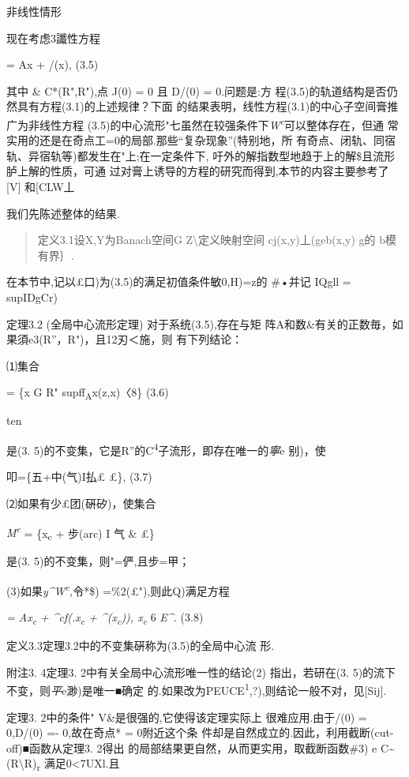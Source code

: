 \documentclass{article}
\begin{document}
非线性情形

现在考虑3讖性方程

= Ax + /(x), (3.5)

其中 \& C*(R",R"),点 J(0) = 0 且 D/(0) = 0.问题是:方
程(3.5)的轨道结构是否仍然具有方程(3.1)的上述规律？下面
的结果表明，线性方程(3.1)的中心子空间膏推广为非线性方程
(3.5)的中心流形"七虽然在较强条件下\emph{W\textsuperscript{c}}可以整体存在，但通
常实用的还是在奇点工=0的局部.那些``复杂现象''(特别地，所
有奇点、闭轨、同宿轨、异宿轨等)都发生在"上;在一定条件下,
吁外的解指数型地趋于上的解\$且流形胪上解的性质，可通
过对膏上诱导的方程的研究而得到,本节的内容主要参考了 {[}V{]} 和{[}CLW丄

我们先陈述整体的结果.

\begin{quote}
定义3.1设X,Y为Banach空间G Z\textbackslash{}定义映射空间
cj(x,y)丄(geb(x,y)\textbar{} g的 b模有界｝.
\end{quote}

在本节中,记以£口)为(3.5)的满足初值条件敏0,H)=z的 \#•并记 IQgll =
supIDgCr)

定理3.2 (全局中心流形定理) 对于系统(3.5),存在与矩
阵A和数\&有关的正数毎，如果須e3(R''，R")，且12刃\textbar{}＜施，则
有下列结论：

⑴集合

= \{x G R" \textbar{}
sup\textbar{}ff\textsubscript{A}x(z,x)\textbar{}〈8\} (3.6)

ten

是(3.
5)的不变集，它是R''的C\textsuperscript{4}子流形，即存在唯一的\emph{寧}e
别)，使

叩=\{五+中(气)I払£ £\}, (3.7)

⑵如果有少£团(硏矽)，使集合

\emph{M\textsuperscript{c}} = \{x\textsubscript{c} + 步(arc) I 气 \& £\}

是(3. 5)的不变集，则"=俨,且步=甲；

(3)如果\emph{y\^{}W\textsuperscript{c},}令*\$) =\%2(£"),则此Q)满足方程

\emph{= Ax\textsubscript{c} + \^{}cf(.x\textsubscript{c} +
\^{}(x\textsubscript{c})), x\textsubscript{c}} 6 \emph{E\^{}.} (3.8)

定义3.3定理3.2中的不变集硏称为(3.5)的全局中心流 形.

附注3. 4定理3. 2中有关全局中心流形唯一性的结论(2) 指出，若研在(3.
5)的流下不变，则\emph{平}e渺)是唯一■确定
的.如果改为PEUCE\textsuperscript{1},?),则结论一般不对，见{[}Sij{]}.

定理3. 2中的条件\textbar{}\textbar{}"\textbar{}\textbar{}
V\&是很强的,它使得该定理实际上 很难应用.由于/(0) = 0,D/(0) =-
0,故在奇点* = 0附近这个条
件却是自然成立的.因此，利用截断(cut-off)■函数从定理3. 2得出
的局部结果更自然，从而更实用，取截断函数\#3) e
C\textasciitilde{}(R\textbackslash{}R)\textsubscript{r}
满足0\textless{}7UXl.且
\end{document}
